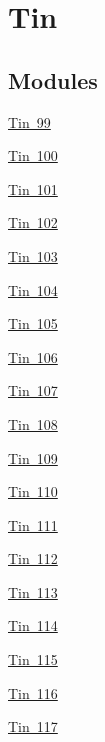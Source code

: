 \hypertarget{group___isotope_const-_tin}{}\section{Tin}
\label{group___isotope_const-_tin}
\subsection*{Modules}
\begin{DoxyCompactItemize}
\item 
\mbox{\hyperlink{group___isotope_const-_tin-_sn99}{Tin 99}}
\item 
\mbox{\hyperlink{group___isotope_const-_tin-_sn100}{Tin 100}}
\item 
\mbox{\hyperlink{group___isotope_const-_tin-_sn101}{Tin 101}}
\item 
\mbox{\hyperlink{group___isotope_const-_tin-_sn102}{Tin 102}}
\item 
\mbox{\hyperlink{group___isotope_const-_tin-_sn103}{Tin 103}}
\item 
\mbox{\hyperlink{group___isotope_const-_tin-_sn104}{Tin 104}}
\item 
\mbox{\hyperlink{group___isotope_const-_tin-_sn105}{Tin 105}}
\item 
\mbox{\hyperlink{group___isotope_const-_tin-_sn106}{Tin 106}}
\item 
\mbox{\hyperlink{group___isotope_const-_tin-_sn107}{Tin 107}}
\item 
\mbox{\hyperlink{group___isotope_const-_tin-_sn108}{Tin 108}}
\item 
\mbox{\hyperlink{group___isotope_const-_tin-_sn109}{Tin 109}}
\item 
\mbox{\hyperlink{group___isotope_const-_tin-_sn110}{Tin 110}}
\item 
\mbox{\hyperlink{group___isotope_const-_tin-_sn111}{Tin 111}}
\item 
\mbox{\hyperlink{group___isotope_const-_tin-_sn112}{Tin 112}}
\item 
\mbox{\hyperlink{group___isotope_const-_tin-_sn113}{Tin 113}}
\item 
\mbox{\hyperlink{group___isotope_const-_tin-_sn114}{Tin 114}}
\item 
\mbox{\hyperlink{group___isotope_const-_tin-_sn115}{Tin 115}}
\item 
\mbox{\hyperlink{group___isotope_const-_tin-_sn116}{Tin 116}}
\item 
\mbox{\hyperlink{group___isotope_const-_tin-_sn117}{Tin 117}}
\item 

\end{DoxyCompactItemize}
